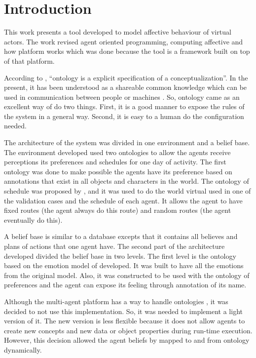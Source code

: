 \section{Introduction}

This work presents a tool developed to model affective behaviour of virtual
actors. The work revised agent oriented programming, computing affective
and how \jason platform \citep{bordini-jason} works which was done because the
tool is a framework built on top of that platform.

According to \citet{gruber1993translation}, ``ontology is a explicit
specification of a conceptualization''. In the present, it has been understood as
a shareable common knowledge which can be used in communication between people
or machines \citep{wks2008towards}. So, ontology came as an excellent way of do
two things. First, it is a good manner to expose the rules of the system in a
general way. Second, it is easy to a human do the configuration needed.

The architecture of the system was divided in one environment and a belief
base. The environment developed used two ontologies to allow the agents
receive perceptions its preferences and schedules for one day of activity.
The first ontology was done to make possible the agents have its preference
based on annotations that exist in all objects and characters in the world.
The ontology of schedule was proposed by \citet{paiva2005ontology}, and it
was used to do the world virtual used in one of the validation cases and the
schedule of each agent. It allows the agent to have fixed routes (the agent
always do this route) and random routes (the agent eventually do this).

A belief base is similar to a database excepts that it contains all believes
and plans of actions that one agent have. The second part of the architecture
developed divided the belief base in two levels. The first level is the
ontology based on the emotion model of \citet{ortony1988cse} developed. It
was built to have all the emotions from the original model. Also, it was
constructed to be used with the ontology of preferences and the agent can
expose its feeling through annotation of its name.

Although the multi-agent platform has a way to handle ontologies
\citep{moreira2006agent}, it was decided to not use this implementation. So,
it was needed to implement a light version of it. The new version is less
flexible because it does not allow agents to create new concepts and new data
or object properties during run-time execution. However, this decision allowed
the agent beliefs by mapped to and from ontology dynamically.

